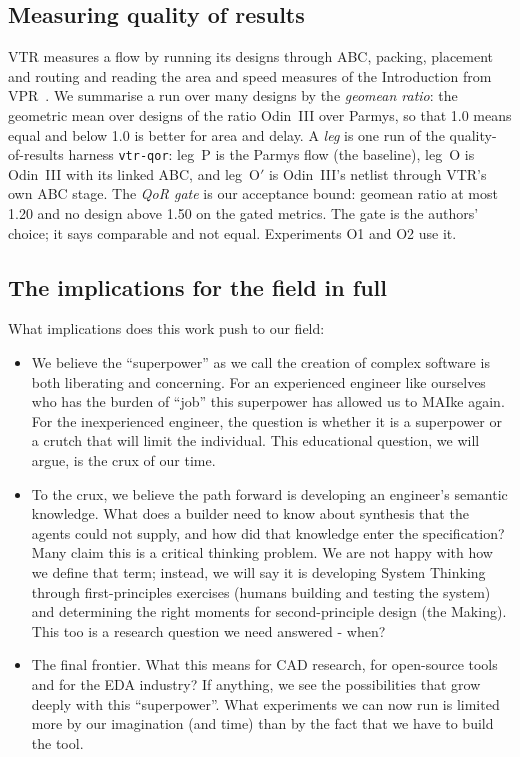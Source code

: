 \documentclass[conference]{IEEEtran}
\newcommand{\code}[1]{\texttt{#1}}
\begin{document}
\subsection{Measuring quality of results}

VTR measures a flow by running its designs through ABC, packing, placement and routing and reading the area and speed measures of the Introduction from VPR~. We summarise a run over many designs by the \emph{geomean ratio}: the geometric mean over designs of the ratio Odin~III over Parmys, so that 1.0 means equal and below 1.0 is better for area and delay.
A \emph{leg} is one run of the quality-of-results harness \code{vtr-qor}: leg~P is the Parmys flow (the baseline), leg~O is Odin~III with its linked ABC, and leg~O$'$ is Odin~III's netlist through VTR's own ABC stage.
The \emph{QoR gate} is our acceptance bound: geomean ratio at most 1.20 and no design above 1.50 on the gated metrics.
The gate is the authors' choice; it says comparable and not equal. Experiments O1 and O2 use it.

\subsection{The implications for the field in full}

What implications does this work push to our field:
\begin{itemize}
\item{We believe the ``superpower'' as we call the creation of complex software is both liberating and concerning.  For an experienced engineer like ourselves who has the burden of ``job'' this superpower has allowed us to MAIke again.  For the inexperienced engineer, the question is whether it is a superpower or a crutch that will limit the individual.  This educational question, we will argue, is the crux of our time.}
\item{To the crux, we believe the path forward is developing an engineer's semantic knowledge. What does a builder need to know about synthesis that the agents
could not supply, and how did that knowledge enter the specification?  Many claim this is a critical thinking problem.  We are not happy with how we define that term; instead, we will say it is developing System Thinking~ through first-principles exercises (humans building and testing the system) and determining the right moments for second-principle design (the Making).  This too is a research question we need answered - when?}
\item{The final frontier. What this means for CAD research, for open-source tools and for the EDA industry?  If anything, we see the possibilities that grow deeply with this ``superpower''.  What experiments we can now run is limited more by our imagination (and time) than by the fact that we have to build the tool.}
\end{itemize}
\end{document}
